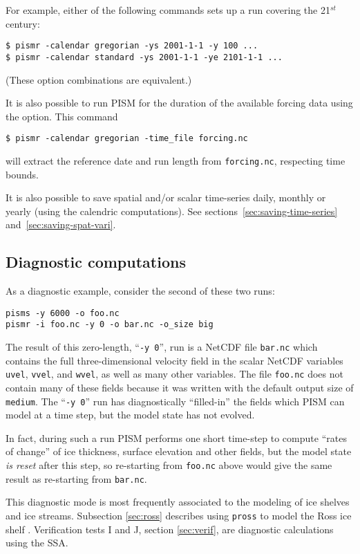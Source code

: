 For example, either of the following commands sets up a run covering the 21$^{st}$ century:
\begin{verbatim}
$ pismr -calendar gregorian -ys 2001-1-1 -y 100 ...
$ pismr -calendar standard -ys 2001-1-1 -ye 2101-1-1 ...
\end{verbatim}
(These option combinations are equivalent.)

It is also possible to run PISM for the duration of the available forcing data using the  option.
This command
\begin{verbatim}
$ pismr -calendar gregorian -time_file forcing.nc
\end{verbatim} %
will extract the reference date and run length from \texttt{forcing.nc}, respecting time bounds.

It is also possible to save spatial and/or scalar time-series daily, monthly or
yearly (using the calendric computations). See sections~\ref{sec:saving-time-series}
and~\ref{sec:saving-spat-vari}.

\subsection{Diagnostic computations}
\label{sec:diagnostic-computations}

 As a diagnostic example, consider the second of these two runs:
\begin{verbatim}
pisms -y 6000 -o foo.nc
pismr -i foo.nc -y 0 -o bar.nc -o_size big
\end{verbatim}

\noindent The result of this zero-length, ``\texttt{-y 0}'', run is a NetCDF file \texttt{bar.nc} which contains the full three-dimensional velocity field in the scalar NetCDF variables \texttt{uvel}, \texttt{vvel}, and \texttt{wvel}, as well as many other variables.  The file \texttt{foo.nc} does not contain many of these fields because it was written with the default output size of \texttt{medium}.  The ``\texttt{-y 0}'' run has diagnostically ``filled-in'' the fields which PISM can model at a time step, but the model state has not evolved.

In fact, during such a run PISM performs one short time-step to compute ``rates of change'' of ice thickness, surface elevation and other fields, but the model state \emph{is reset} after this step, so re-starting from \texttt{foo.nc} above would give the same result as re-starting from \texttt{bar.nc}.

This diagnostic mode is most frequently associated to the modeling of ice shelves and ice streams.  Subsection \ref{sec:ross} describes using \texttt{pross} to model the Ross ice shelf \cite{MacAyealetal}.  Verification tests I and J, section \ref{sec:verif}, are diagnostic calculations using the SSA.

